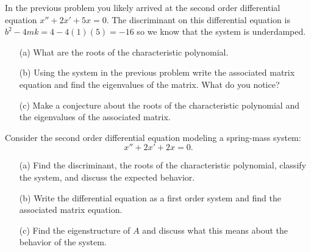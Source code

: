 \begin{problem}
    In the previous problem you likely arrived at the second order differential equation
    $x'' + 2x' + 5x = 0$.  The discriminant on this differential equation is
    $b^2-4mk=4-4(1)(5)=-16$ so we know that the system is underdamped.  
    \begin{enumerate}
        \item[(a)] What are the roots of the characteristic polynomial.
        \item[(b)] Using the system in the previous problem write the associated matrix
            equation and find the eigenvalues of the matrix.  What do you notice?
        \item[(c)] Make a conjecture about the roots of the characteristic polynomial and
            the eigenvalues of the associated matrix.
    \end{enumerate}
\end{problem}

\begin{problem}
    Consider the second order differential equation modeling a spring-mass system: 
    \[ x'' + 2x' + 2x = 0. \]
    \begin{enumerate}
        \item[(a)] Find the discriminant, the roots of the characteristic polynomial,
            classify the system, and discuss the expected behavior.
        \item[(b)] Write the differential equation as a first order system and find the
            associated matrix equation.
            \solution{
            \[ \begin{pmatrix} x' \\ y' \end{pmatrix} = \begin{pmatrix} 0 & 1 \\ -2 & -2
                \end{pmatrix} \begin{pmatrix} x \\ y \end{pmatrix}. \]
            }
        \item[(c)] Find the eigenstructure of $A$ and discuss what this means about the
            behavior of the system.
    \end{enumerate}
\end{problem}


